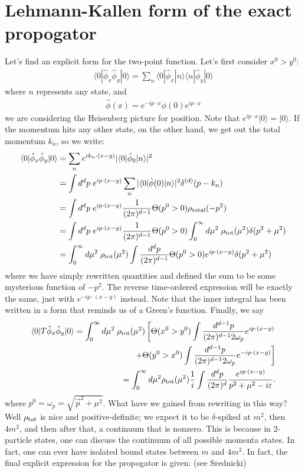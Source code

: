 \documentclass{../mathnotes}
\begin{document}
\section*{Lehmann-Kallen form of the exact propogator}

Let's find an explicit form for the two-point function. Let's first consider $x^0>y^0:$
\begin{align*}
    \langle 0|\hat\phi_x\hat\phi_y|0\rangle=\sum_{n}\langle 0 | \hat\phi_x|n\rangle\langle n|\hat\phi_y|0\rangle
\end{align*}
where $n$ represents any state, and 
\begin{align*}
    \hat\phi(x)=e^{-ip\cdot x}\phi(0)e^{ip\cdot x}
\end{align*}
we are considering the Heisenberg picture for position. Note that $e^{ip\cdot x}|0\rangle=|0\rangle$. If the momentum hits
any other state, on the other hand, we get out the total momentum $k_n$, so we write:
\begin{align*}
    \langle 0|\hat\phi_x\hat\phi_y|0\rangle&=\sum_ne^{ik_n\cdot(x-y)}|\langle0|\hat\phi_0|n\rangle|^2\\
    &=\int d^dp\; e^{ip\cdot (x-y)}\sum_n|\langle 0|\hat\phi(0)|n\rangle|^2\delta^{(d)}(p-k_n)\\
    &=\int d^dp\; e^{ip\cdot (x-y)} \frac{1}{(2\pi)^{d-1}}\Theta(p^0>0)\rho_{\rm total}(-p^2)\\
    &=\int d^dp\; e^{ip\cdot (x-y)} \frac{1}{(2\pi)^{d-1}}\Theta(p^0>0)\int_0^\infty d\mu^2\;\rho_{\rm tot}(\mu^2)\delta(p^2+\mu^2)\\
    &=\int_0^\infty d\mu^2\;\rho_{\rm tot}(\mu^2)\int\frac{d^dp}{(2\pi)^{d-1}}\Theta(p^0>0)e^{ip\cdot(x-y)}\delta(p^2+\mu^2)
\end{align*}
where we have simply rewritten quantities and defined the sum to be some mysterious function of $-p^2$.
The reverse time-ordered expression will be exactly the same, just with $e^{-ip\cdot(x-y)}$ instead. Note that the inner integral has been
written in a form that reminds us of a Green's function. Finally, we say
\begin{align*}
    \langle 0|T\hat\phi_x\hat\phi_y|0\rangle
    =\int_0^\infty d\mu^2\;\rho_{\rm tot}(\mu^2)\left[\Theta(x^0>y^0)\int \frac{d^{d-1}p}{(2\pi)^{d-1}2\omega_p}e^{ip\cdot(x-y)}\right.\\
        \left.+\Theta(y^0>x^0)\int \frac{d^{d-1}p}{(2\pi)^{d-1}2\omega_p}e^{-ip\cdot(x-y)}\right]\\
        =\int_0^\infty d\mu^2\rho_{\rm tot}(\mu^2)\frac{1}{i}\int \frac{d^dp}{(2\pi)^d}\frac{e^{ip\cdot (x-y)}}{p^2+\mu^2-i\varepsilon}.
\end{align*}
where $p^0=\omega_p=\sqrt{\vec{p}^2+\mu^2}$. What have we gained from rewriting in this way? Well $\rho_{\rm tot}$ is nice and positive-definite;
we expect it to be $\delta$-spiked at $m^2$, then $4m^2$, and then after that, a continuum that is nonzero. This is because in 2-particle states,
one can discuss the continuum of all possible momenta states. In fact, one can ever have isolated bound states between $m$ and $4m^2$. 
In fact, the final explicit expression for the propogator is given: (see Srednicki)
\end{document}
